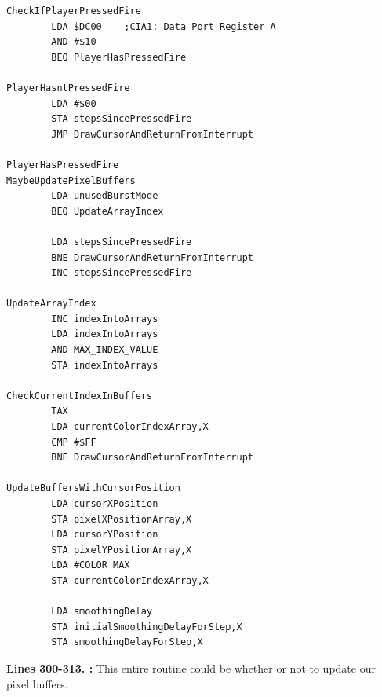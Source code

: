 \clearpage
\begin{lstlisting}
CheckIfPlayerPressedFire   
        LDA $DC00    ;CIA1: Data Port Register A
        AND #$10
        BEQ PlayerHasPressedFire

PlayerHasntPressedFire
        LDA #$00
        STA stepsSincePressedFire
        JMP DrawCursorAndReturnFromInterrupt

PlayerHasPressedFire
MaybeUpdatePixelBuffers   
        LDA unusedBurstMode
        BEQ UpdateArrayIndex

        LDA stepsSincePressedFire
        BNE DrawCursorAndReturnFromInterrupt
        INC stepsSincePressedFire

UpdateArrayIndex   
        INC indexIntoArrays
        LDA indexIntoArrays
        AND MAX_INDEX_VALUE
        STA indexIntoArrays

CheckCurrentIndexInBuffers  
        TAX 
        LDA currentColorIndexArray,X
        CMP #$FF
        BNE DrawCursorAndReturnFromInterrupt

UpdateBuffersWithCursorPosition
        LDA cursorXPosition
        STA pixelXPositionArray,X
        LDA cursorYPosition
        STA pixelYPositionArray,X
        LDA #COLOR_MAX
        STA currentColorIndexArray,X

        LDA smoothingDelay
        STA initialSmoothingDelayForStep,X
        STA smoothingDelayForStep,X

\end{lstlisting}
\clearpage

\textbf{Lines 300-313. :} This entire routine could be 
whether or not to update our pixel buffers. 

